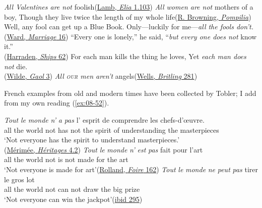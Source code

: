 \ex
\emph{All Valentines are not} foolish\hfill(\href{https://archive.org/details/essayseliacharle00lamb/page/66/mode/2up?q=%22all+valentines+are+not%22&view=theater}{Lamb, \textit{Elia} 1.103})
\ex
\emph{All women are not} mothers of a boy, Though they live twice the length of my whole life\hfill(\href{https://archive.org/details/ringandbook17browgoog/page/300/mode/2up?q=%22All+women+are+not%22&view=theater}{R. Browning, \textit{Pompilia}})
\ex
Well, any fool can get up a Blue Book. Only---luckily for me---\emph{all the fools don't.}\hfill(\href{https://archive.org/details/marriageofwillia0000mrsh_i0u5/page/10/mode/2up?q=%22up+a+blue+book%22&view=theater}{Ward, \textit{Marriage} 16}) %
\ex
``Every one is lonely,'' he said, ``\emph{but every one does not} know it.''\\\hfill(\href{https://archive.org/details/shipsthatpassin00harr/page/110/mode/2up?view=theater&q=%22Every+one+is+lonely%22}{Harraden, \textit{Ships} 62}) %
\ex
For each man kills the thing he loves, Yet \emph{each man does not} die.\\\hfill(\href{https://archive.org/details/balladofreadingg00wild/page/8/mode/2up?view=theater&q=%22each+man+kills%22}{Wilde, \textit{Gaol} 3})
\ex
\emph{All \textsc{our} men aren't} angels\hfill(\href{https://archive.org/details/mrbritlingseesi02unkngoog/page/n298/mode/2up?view=theater&q=%22all+our+men%22}{Wells, \textit{Britling} 281}) %
\z
\z{}

French examples from old and modern times have been collected by Tobler; I add from my own reading (\ref{ex:08-52}).

\ea \label{ex:08-52}
\ea 
\gll \emph{Tout} \emph{le} \emph{monde} \emph{n'} \emph{a} \emph{pas} l' esprit de comprendre les chefs-d'œuvre.\\
 all the world not has not the spirit of understanding the masterpieces\\
\glt `Not everyone has the spirit to understand masterpieces.'\\\hfill(\href{https://archive.org/details/lesdeuxhritages02gogogoog/page/n97/mode/2up?q=%22tout+le+monde+n%27a%22&view=theater}{Mérimée, \textit{Héritages} 4.2}) %
\ex
\gll \emph{Tout} \emph{le} \emph{monde} \emph{n'} \emph{est} \emph{pas} fait pour l'art\\
 all the world not is not made for {the art}\\
\glt `Not everyone is made for art'\hfill(\href{https://www.gutenberg.org/cache/epub/61876/pg61876-images.html}{Rolland, \textit{Foire} 162})
\ex
\gll \emph{Tout} \emph{le} \emph{monde} \emph{ne} \emph{peut} \emph{pas} tirer le gros lot\\
 all the world not can not draw the big prize\\
\glt `Not everyone can win the jackpot'\hfill(\href{https://www.gutenberg.org/cache/epub/61876/pg61876-images.html}{ibid 295})
\z
\z
{}

